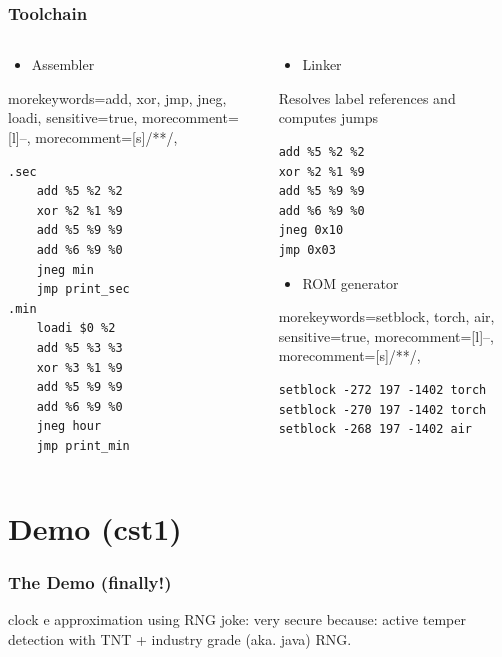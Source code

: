 \documentclass[aspectratio=169]{beamer}
\begin{document}
\begin{frame}[fragile]
	\frametitle{Toolchain}
	\begin{columns}
		\begin{column}{0.4\textwidth}
			\begin{itemize}
				\item Assembler
			\end{itemize}
			{morekeywords={add, xor, jmp, jneg, loadi},
				sensitive=true,
				morecomment=[l]{--},
				morecomment=[s]{/*}{*/},
			}
			\lstset{language=asm}
			\begin{lstlisting}
.sec
	add %5 %2 %2
	xor %2 %1 %9
	add %5 %9 %9
	add %6 %9 %0
	jneg min
	jmp print_sec
.min
	loadi $0 %2
	add %5 %3 %3
	xor %3 %1 %9
	add %5 %9 %9
	add %6 %9 %0
	jneg hour
	jmp print_min
	\end{lstlisting}
		\end{column}
		\pause
		\begin{column}{0.6\textwidth}
			\begin{itemize}
				\item Linker
			\end{itemize}
			Resolves label references and computes jumps
			\lstset{language=asm}
			\begin{lstlisting}
add %5 %2 %2
xor %2 %1 %9
add %5 %9 %9
add %6 %9 %0
jneg 0x10
jmp 0x03
	\end{lstlisting}
			\pause
			\begin{itemize}
				\item ROM generator
			\end{itemize}
			{morekeywords={setblock, torch, air},
				sensitive=true,
				morecomment=[l]{--},
				morecomment=[s]{/*}{*/},
			}
			\lstset{language=command}
			\begin{lstlisting}
setblock -272 197 -1402 torch
setblock -270 197 -1402 torch
setblock -268 197 -1402 air
        \end{lstlisting}
		\end{column}
	\end{columns}
\end{frame}

\section{Demo (cst1)}

\begin{frame}
	\frametitle{The Demo (finally!)}
	clock
	e approximation using RNG
	joke: very secure because: active temper detection with TNT + industry grade (aka. java) RNG.
\end{frame}
\end{document}
